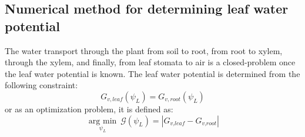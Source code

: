 %


\subsection{Numerical method for determining leaf water potential}

The water transport through the plant from soil to root, from root to xylem, through the xylem, and finally, from leaf stomata to air is a closed-problem once the leaf water potential is known. The leaf water potential is determined from the following constraint:
\begin{equation}
G_{v,leaf}(\psi_L) = G_{v,root} (\psi_L)
\end{equation}
or as an optimization problem, it is defined as:
\begin{equation}
\mathop {\mathrm{arg\ min} }\limits_{\psi_L}~\mathcal{G}(\psi _L) = \left| {{G_{\textit{v,leaf}}} - {G_{\textit{v,root}}}} \right|
\end{equation}

